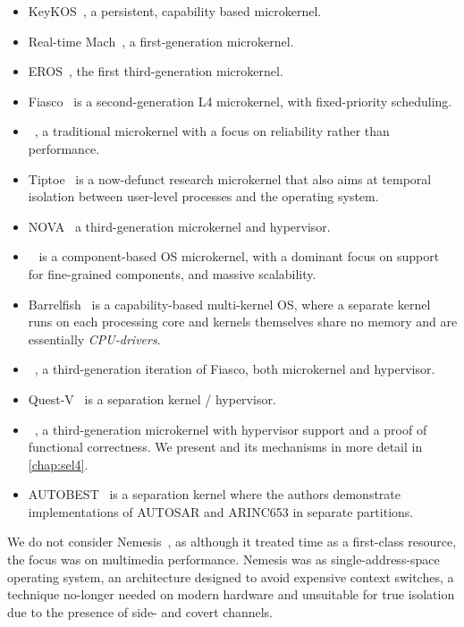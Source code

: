 \begin{itemize}
    \item KeyKOS~\citep{Bomberger_FFHLS_92}, a persistent, capability based microkernel. 
    \item Real-time Mach~\citep{Mercer_RZ_94, Mercer_ST_93}, a first-generation microkernel.
    \item EROS~\citep{Shapiro_SF_99}, the first third-generation microkernel.
    \item Fiasco~\citep{Haertig_BBHHMRSW_98,Hohmuth_02} is a second-generation L4 microkernel, with fixed-priority scheduling.
    \item \minix~\citep{Herder_BGHT_06}, a traditional microkernel with a focus on reliability
        rather than performance. 
    \item Tiptoe~\citep{Craciunas_KPRS_09} is a now-defunct research microkernel that also aims at
temporal isolation between user-level processes and the operating system.
    \item NOVA~\citep{Steinberg_Kauer_10} a third-generation microkernel and hypervisor.
    \item \composite~\citep{Parmer:phd} is a component-based \gls{OS} microkernel, with a dominant focus
        on support for fine-grained components, and massive scalability.
    \item Barrelfish~\citep{Peter_SBBIHR_10} is a capability-based multi-kernel \gls{OS}, where a separate kernel runs on each processing core and kernels themselves share no memory and are essentially \emph{\gls{CPU}-drivers}.
    \item \fiascooc~\citep{Lackorzynski_WVH_12}, a third-generation iteration of Fiasco, both microkernel and
        hypervisor.
    \item Quest-V~\citep{Danish_LW_11} is a separation kernel / hypervisor.
    \item \selfour~\citep{Klein_AEMSKH_14}, a third-generation microkernel with
        hypervisor support and a proof of functional correctness. We present \selfour 
        and its mechanisms in more detail in \cref{chap:sel4}.
    \item AUTOBEST~\citep{Zuepke_BL_15} is a separation kernel where the authors demonstrate implementations
           of AUTOSAR and ARINC653 in separate partitions.
\end{itemize}

We do not consider Nemesis~\citep{Leslie_MBRBEFH_96}, as although it treated time as a first-class
resource, the focus was on multimedia performance. Nemesis was as single-address-space operating
system, an architecture designed to avoid expensive context switches, a technique no-longer needed
on modern hardware and unsuitable for true isolation due to the presence of side- and covert
channels.

